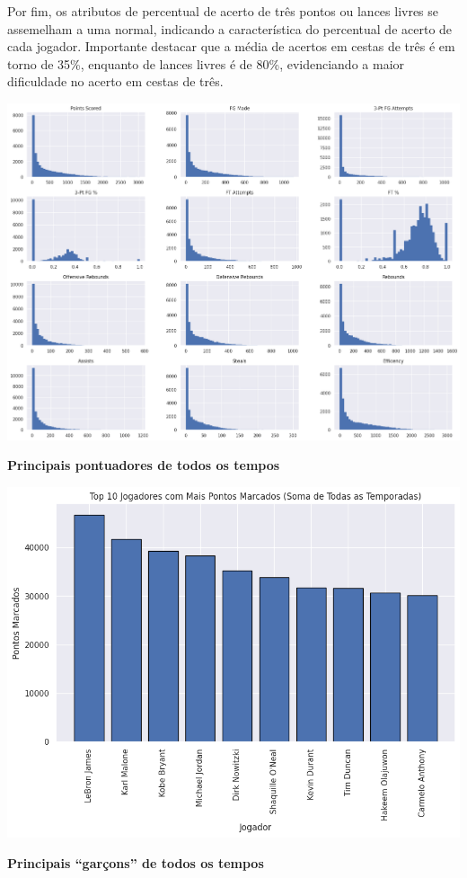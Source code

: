 \documentclass[
]{book}
\begin{document}
Por fim, os atributos de percentual de acerto de três pontos ou lances livres se assemelham a uma normal, indicando a característica do percentual de acerto de cada jogador. Importante destacar que a média de acertos em cestas de três é em torno de 35\%, enquanto de lances livres é de 80\%, evidenciando a maior dificuldade no acerto em cestas de três.

\includegraphics{imagens/15.png}

\textbf{Principais pontuadores de todos os tempos}

\includegraphics{imagens/16.png}

\textbf{Principais ``garçons'' de todos os tempos}
\end{document}
